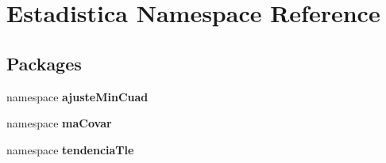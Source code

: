 \section{\-Estadistica \-Namespace \-Reference}
\label{namespace_estadistica}
\subsection*{\-Packages}
\begin{DoxyCompactItemize}
\item 
namespace {\bf ajuste\-Min\-Cuad}
\item 
namespace {\bf ma\-Covar}
\item 
namespace {\bf tendencia\-Tle}
\end{DoxyCompactItemize}
